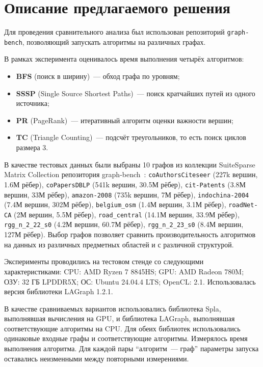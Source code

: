 \documentclass[a4paper]{article}
\begin{document}
\section{Описание предлагаемого решения}
Для проведения сравнительного анализа был использован репозиторий \texttt{graph-bench}, позволяющий запускать алгоритмы на различных графах.
	
В рамках эксперимента оценивалось время выполнения четырёх алгоритмов:
\begin{itemize}[noitemsep]
\item \textbf{BFS} (поиск в ширину)~--- обход графа по уровням;
\item \textbf{SSSP} (Single Source Shortest Paths)~--- поиск кратчайших путей из одного источника;
\item \textbf{PR} (PageRank)~--- итеративный алгоритм оценки важности вершин;
\item \textbf{TC} (Triangle Counting)~--- подсчёт треугольников, то есть поиск циклов размера 3.
\end{itemize}
	
В качестве тестовых данных были выбраны 10 графов из коллекции SuiteSparse Matrix Collection репозитория graph-bench~\cite{graph-bench}: \texttt{coAuthorsCiteseer} (227k вершин, 1.6М рёбер), \texttt{coPapersDBLP} (541k вершин, 30.5М рёбер), \texttt{cit-Patents} (3.8М вершин, 33М рёбер), \texttt{amazon-2008} (735k вершин, 7М рёбер), \texttt{indochina-2004} (7.4М вершин, 302М рёбер), \texttt{belgium\_osm} (1.4М вершин, 3.1М рёбер), \texttt{roadNet-CA} (2М вершин, 5.5М рёбер), \texttt{road\_central} (14.1М вершин, 33.9М рёбер), \texttt{rgg\_n\_2\_22\_s0} (4.2М вершин, 60.7М рёбер), \texttt{rgg\_n\_2\_23\_s0} (8.4М вершин, 127М рёбер). Выбор графов позволяет сравнить производительность алгоритмов на данных из различных предметных областей и с различной структурой.
	
Эксперименты проводились на тестовом стенде со следующими характеристиками: CPU: AMD Ryzen 7 8845HS; GPU: AMD Radeon 780M; ОЗУ: 32 ГБ LPDDR5X; ОС: Ubuntu 24.04.4 LTS; OpenCL: 2.1. Использовалась версия библиотеки LAGraph 1.2.1.
	
В качестве сравниваемых вариантов использовались библиотека Spla,
выполнявшая вычисления на GPU, и библиотека LAGraph, выполнявшая
соответствующие алгоритмы на CPU. Для обеих библиотек использовались
одинаковые входные графы и соответствующие алгоритмы. Измерялось
время выполнения алгоритма. Для каждой пары \enquote{алгоритм~--- граф} параметры запуска оставались неизменными между повторными измерениями.
\end{document}
